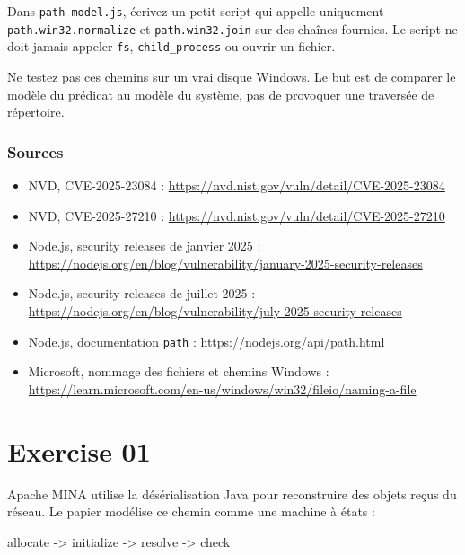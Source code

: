 \documentclass{training}
\begin{document}
Dans \texttt{path-model.js}, écrivez un petit script qui appelle uniquement
\texttt{path.win32.normalize} et \texttt{path.win32.join} sur des chaînes
fournies. Le script ne doit jamais appeler \texttt{fs}, \texttt{child\_process}
ou ouvrir un fichier.

\begin{warn}
Ne testez pas ces chemins sur un vrai disque Windows. Le but est de comparer
le modèle du prédicat au modèle du système, pas de provoquer une traversée
de répertoire.
\end{warn}

\subsection*{Sources}
\begin{itemize}
  \item NVD, CVE-2025-23084 :
        \url{https://nvd.nist.gov/vuln/detail/CVE-2025-23084}
  \item NVD, CVE-2025-27210 :
        \url{https://nvd.nist.gov/vuln/detail/CVE-2025-27210}
  \item Node.js, security releases de janvier 2025 :
        \url{https://nodejs.org/en/blog/vulnerability/january-2025-security-releases}
  \item Node.js, security releases de juillet 2025 :
        \url{https://nodejs.org/en/blog/vulnerability/july-2025-security-releases}
  \item Node.js, documentation \texttt{path} :
        \url{https://nodejs.org/api/path.html}
  \item Microsoft, nommage des fichiers et chemins Windows :
        \url{https://learn.microsoft.com/en-us/windows/win32/fileio/naming-a-file}
\end{itemize}

\chapter{Exercise 01}
\makeheaderfiles

Apache MINA utilise la désérialisation Java pour reconstruire des objets
reçus du réseau. Le papier modélise ce chemin comme une machine à états :

\begin{console}
allocate -> initialize -> resolve -> check
\end{console}
\end{document}
